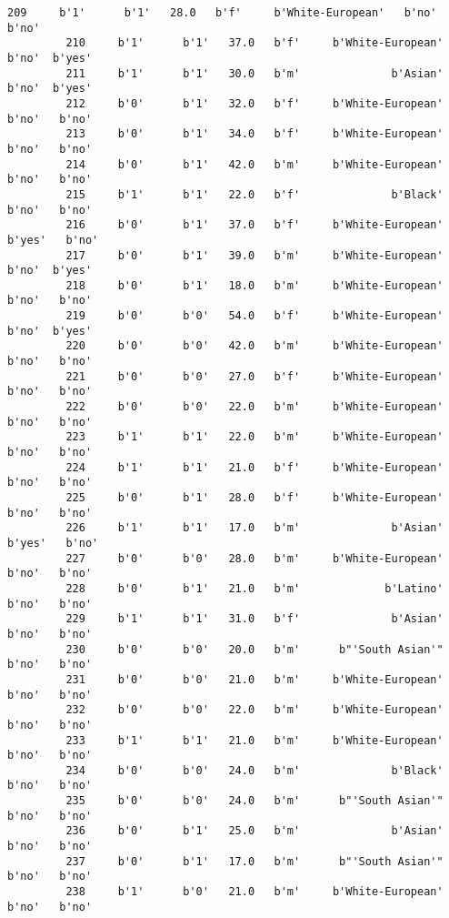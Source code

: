 \documentclass[11pt]{article}
\begin{document}
\begin{Verbatim}[commandchars=\\\{\}]
         209     b'1'      b'1'   28.0   b'f'     b'White-European'   b'no'   b'no'   
         210     b'1'      b'1'   37.0   b'f'     b'White-European'   b'no'  b'yes'   
         211     b'1'      b'1'   30.0   b'm'              b'Asian'   b'no'  b'yes'   
         212     b'0'      b'1'   32.0   b'f'     b'White-European'   b'no'   b'no'   
         213     b'0'      b'1'   34.0   b'f'     b'White-European'   b'no'   b'no'   
         214     b'0'      b'1'   42.0   b'm'     b'White-European'   b'no'   b'no'   
         215     b'1'      b'1'   22.0   b'f'              b'Black'   b'no'   b'no'   
         216     b'0'      b'1'   37.0   b'f'     b'White-European'  b'yes'   b'no'   
         217     b'0'      b'1'   39.0   b'm'     b'White-European'   b'no'  b'yes'   
         218     b'0'      b'1'   18.0   b'm'     b'White-European'   b'no'   b'no'   
         219     b'0'      b'0'   54.0   b'f'     b'White-European'   b'no'  b'yes'   
         220     b'0'      b'0'   42.0   b'm'     b'White-European'   b'no'   b'no'   
         221     b'0'      b'0'   27.0   b'f'     b'White-European'   b'no'   b'no'   
         222     b'0'      b'0'   22.0   b'm'     b'White-European'   b'no'   b'no'   
         223     b'1'      b'1'   22.0   b'm'     b'White-European'   b'no'   b'no'   
         224     b'1'      b'1'   21.0   b'f'     b'White-European'   b'no'   b'no'   
         225     b'0'      b'1'   28.0   b'f'     b'White-European'   b'no'   b'no'   
         226     b'1'      b'1'   17.0   b'm'              b'Asian'  b'yes'   b'no'   
         227     b'0'      b'0'   28.0   b'm'     b'White-European'   b'no'   b'no'   
         228     b'0'      b'1'   21.0   b'm'             b'Latino'   b'no'   b'no'   
         229     b'1'      b'1'   31.0   b'f'              b'Asian'   b'no'   b'no'   
         230     b'0'      b'0'   20.0   b'm'      b"'South Asian'"   b'no'   b'no'   
         231     b'0'      b'0'   21.0   b'm'     b'White-European'   b'no'   b'no'   
         232     b'0'      b'0'   22.0   b'm'     b'White-European'   b'no'   b'no'   
         233     b'1'      b'1'   21.0   b'm'     b'White-European'   b'no'   b'no'   
         234     b'0'      b'0'   24.0   b'm'              b'Black'   b'no'   b'no'   
         235     b'0'      b'0'   24.0   b'm'      b"'South Asian'"   b'no'   b'no'   
         236     b'0'      b'1'   25.0   b'm'              b'Asian'   b'no'   b'no'   
         237     b'0'      b'1'   17.0   b'm'      b"'South Asian'"   b'no'   b'no'   
         238     b'1'      b'0'   21.0   b'm'     b'White-European'   b'no'   b'no'   

\end{Verbatim}
\end{document}
